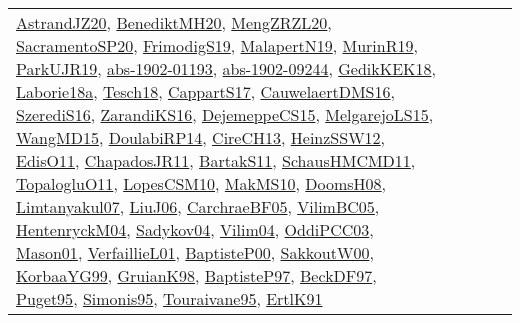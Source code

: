 {\begin{longtable}{lp{3cm}>{\raggedright}p{6cm}>{\raggedright}p{6cm}p{8cm}}
\href{articles/AstrandJZ20.pdf}{AstrandJZ20}\cite{AstrandJZ20}, \href{articles/BenediktMH20.pdf}{BenediktMH20}\cite{BenediktMH20}, \href{articles/MengZRZL20.pdf}{MengZRZL20}\cite{MengZRZL20}, \href{articles/SacramentoSP20.pdf}{SacramentoSP20}\cite{SacramentoSP20}, \href{papers/FrimodigS19.pdf}{FrimodigS19}\cite{FrimodigS19}, \href{papers/MalapertN19.pdf}{MalapertN19}\cite{MalapertN19}, \href{papers/MurinR19.pdf}{MurinR19}\cite{MurinR19}, \href{papers/ParkUJR19.pdf}{ParkUJR19}\cite{ParkUJR19}, \href{articles/abs-1902-01193.pdf}{abs-1902-01193}\cite{abs-1902-01193}, \href{articles/abs-1902-09244.pdf}{abs-1902-09244}\cite{abs-1902-09244}, \href{articles/GedikKEK18.pdf}{GedikKEK18}\cite{GedikKEK18}, \href{papers/Laborie18a.pdf}{Laborie18a}\cite{Laborie18a}, \href{papers/Tesch18.pdf}{Tesch18}\cite{Tesch18}, \href{papers/CappartS17.pdf}{CappartS17}\cite{CappartS17}, \href{papers/CauwelaertDMS16.pdf}{CauwelaertDMS16}\cite{CauwelaertDMS16}, \href{papers/SzerediS16.pdf}{SzerediS16}\cite{SzerediS16}, \href{articles/ZarandiKS16.pdf}{ZarandiKS16}\cite{ZarandiKS16}, \href{papers/DejemeppeCS15.pdf}{DejemeppeCS15}\cite{DejemeppeCS15}, \href{papers/MelgarejoLS15.pdf}{MelgarejoLS15}\cite{MelgarejoLS15}, \href{articles/WangMD15.pdf}{WangMD15}\cite{WangMD15}, \href{papers/DoulabiRP14.pdf}{DoulabiRP14}\cite{DoulabiRP14}, \href{papers/CireCH13.pdf}{CireCH13}\cite{CireCH13}, \href{articles/HeinzSSW12.pdf}{HeinzSSW12}\cite{HeinzSSW12}, \href{papers/EdisO11.pdf}{EdisO11}\cite{EdisO11}, \href{papers/ChapadosJR11.pdf}{ChapadosJR11}\cite{ChapadosJR11}, \href{articles/BartakS11.pdf}{BartakS11}\cite{BartakS11}, \href{articles/SchausHMCMD11.pdf}{SchausHMCMD11}\cite{SchausHMCMD11}, \href{articles/TopalogluO11.pdf}{TopalogluO11}\cite{TopalogluO11}, \href{articles/LopesCSM10.pdf}{LopesCSM10}\cite{LopesCSM10}, \href{papers/MakMS10.pdf}{MakMS10}\cite{MakMS10}, \href{papers/DoomsH08.pdf}{DoomsH08}\cite{DoomsH08}, \href{papers/Limtanyakul07.pdf}{Limtanyakul07}\cite{Limtanyakul07}, \href{papers/LiuJ06.pdf}{LiuJ06}\cite{LiuJ06}, \href{papers/CarchraeBF05.pdf}{CarchraeBF05}\cite{CarchraeBF05}, \href{articles/VilimBC05.pdf}{VilimBC05}\cite{VilimBC05}, \href{papers/HentenryckM04.pdf}{HentenryckM04}\cite{HentenryckM04}, \href{papers/Sadykov04.pdf}{Sadykov04}\cite{Sadykov04}, \href{papers/Vilim04.pdf}{Vilim04}\cite{Vilim04}, \href{papers/OddiPCC03.pdf}{OddiPCC03}\cite{OddiPCC03}, \href{articles/Mason01.pdf}{Mason01}\cite{Mason01}, \href{papers/VerfaillieL01.pdf}{VerfaillieL01}\cite{VerfaillieL01}, \href{articles/BaptisteP00.pdf}{BaptisteP00}\cite{BaptisteP00}, \href{articles/SakkoutW00.pdf}{SakkoutW00}\cite{SakkoutW00}, \href{papers/KorbaaYG99.pdf}{KorbaaYG99}\cite{KorbaaYG99}, \href{papers/GruianK98.pdf}{GruianK98}\cite{GruianK98}, \href{papers/BaptisteP97.pdf}{BaptisteP97}\cite{BaptisteP97}, \href{papers/BeckDF97.pdf}{BeckDF97}\cite{BeckDF97}, \href{papers/Puget95.pdf}{Puget95}\cite{Puget95}, \href{papers/Simonis95.pdf}{Simonis95}\cite{Simonis95}, \href{papers/Touraivane95.pdf}{Touraivane95}\cite{Touraivane95}, \href{papers/ErtlK91.pdf}{ErtlK91}\cite{ErtlK91}\\

\end{longtable}}
